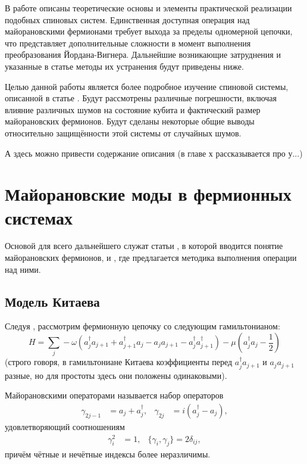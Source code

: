 \documentclass[a4paper,12pt]{article}
\theoremstyle{plain} %
\theoremstyle{definition} %
\theoremstyle{remark} %
\begin{document}
В работе \cite{main} описаны теоретические основы и элементы практической реализации подобных спиновых систем. Единственная доступная операция над майорановскими фермионами требует выхода за пределы одномерной цепочки, что представляет дополнительные сложности в момент выполнения преобразования Йордана-Вигнера. Дальнейшие возникающие затруднения и указанные в статье методы их устранения будут приведены ниже.

Целью данной работы является более подробное изучение спиновой системы, описанной в статье \cite{main}. Будут рассмотрены различные погрешности, включая влияние различных шумов на состояние кубита и фактический размер майорановских фермионов. Будут сделаны некоторые общие выводы относительно защищённости этой системы от случайных шумов.

{\color{red}А здесь можно привести содержание описания (в главе х рассказывается про у...)}


\pagebreak

\section{Майорановские моды в фермионных системах}

Основой для всего дальнейшего служат статьи \cite{kitaev}, в которой вводится понятие майорановских фермионов, и \cite{braiding}, где предлагается методика выполнения операции над ними.

\subsection{Модель Китаева}
Следуя \cite{kitaev}, рассмотрим фермионную цепочку со следующим гамильтонианом:
\begin{equation}
    H = \sum\limits_j -\omega (a_j^\dagger a_{j+1} + a_{j+1}^\dagger a_j - a_j a_{j+1} - a_j^\dagger a_{j+1}^\dagger) - \mu \left( a_j^\dagger a_j - \frac{1}{2} \right)
\end{equation}
(строго говоря, в гамильтониане Китаева коэффициенты перед $a_j^\dagger a_{j+1}$ и $a_j a_{j+1}$ разные, но для простоты здесь они положены одинаковыми).

Майорановскими операторами называется набор операторов
\begin{align}
\gamma_{2j-1} &= a_j + a_j^\dagger, & \gamma_{2j} &= i\left( a_j^\dagger - a_j \right),
\end{align}
удовлетворяющий соотношениям
\begin{align}
\gamma_i^2 &= 1, & \{\gamma_i, \gamma_j\} = 2 \delta_{ij},
\end{align}
причём чётные и нечётные индексы более неразличимы.
\end{document}
